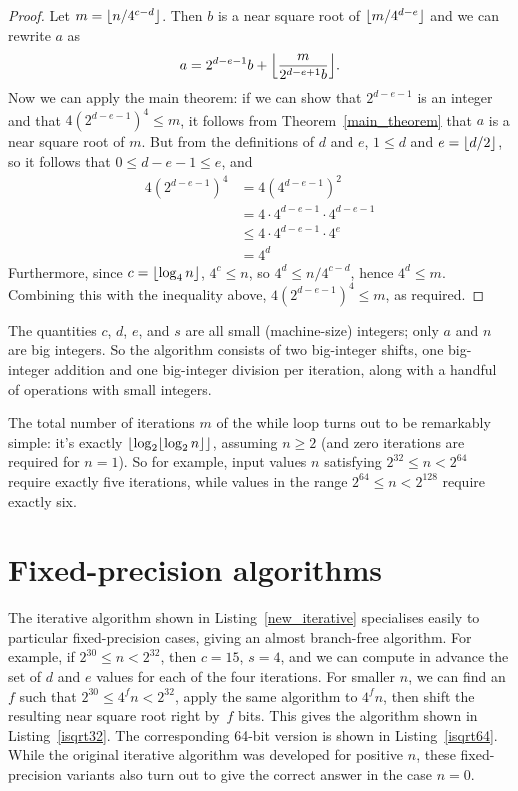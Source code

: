 \documentclass[a4paper]{article}
\DeclarePairedDelimiter\floor{\lfloor}{\rfloor}
\theoremstyle{plain}
\theoremstyle{definition}
\begin{document}
\begin{proof}
  Let $m = \floor{n / 4^{c-d}}$. Then $b$ is a near square root of
  $\floor{m/4^{d-e}}$ and we can rewrite $a$ as
  $$a = 2^{d-e-1}b + \floor*{\frac{m}{2^{d-e+1}b}}.$$ Now we can apply the main
  theorem: if we can show that $2^{d-e-1}$ is an integer and that
  $4(2^{d-e-1})^4 \le m$, it follows from Theorem~\ref{main_theorem} that $a$
  is a near square root of $m$. But from the definitions of $d$ and $e$, $1 \le
  d$ and $e = \floor{d/2}$, so it follows that $0 \le d - e - 1 \le e$, and
  \begin{align*}
    4(2^{d-e-1})^4 &= 4(4^{d-e-1})^2 \\
                  &= 4\cdot 4^{d-e-1}\cdot 4^{d-e-1} \\
                  &\le 4\cdot 4^{d-e-1}\cdot 4^e \\
                  &= 4^d
  \end{align*}
  Furthermore, since $c = \floor{\log_4 n}$, $4^c \le n$, so $4^d \le n /
  4^{c-d}$, hence $4^d \le m$. Combining this with the inequality above,
  $4(2^{d-e-1})^4 \le m$, as required.
\end{proof}

The quantities $c$, $d$, $e$, and $s$ are all small (machine-size)
integers; only $a$ and $n$ are big integers. So the algorithm consists of
two big-integer shifts, one big-integer addition and one big-integer division per
iteration, along with a handful of operations with small integers.

The total number of iterations $m$ of the while loop turns out to be remarkably
simple: it's exactly $\floor*{\log_2 \floor{\log_2 n}}$, assuming $n\ge 2$ (and zero
iterations are required for $n = 1$). So
for example, input values $n$ satisfying $2^{32} \le n < 2^{64}$ require exactly
five iterations, while values in the range $2^{64} \le n < 2^{128}$ require
exactly six.

\section{Fixed-precision algorithms}

The iterative algorithm shown in Listing~\ref{new_iterative} specialises easily
to particular fixed-precision cases, giving an almost branch-free algorithm.
For example, if $2^{30} \le n < 2^{32}$, then $c = 15$, $s=4$, and we can
compute in advance the set of $d$ and $e$ values for each of the four
iterations. For smaller $n$, we can find an $f$ such that $2^{30} \le 4^f n <
2^{32}$, apply the same algorithm to $4^f n$, then shift the resulting near
square root right by~$f$ bits. This gives the algorithm shown in
Listing~\ref{isqrt32}. The corresponding 64-bit version is shown in
Listing~\ref{isqrt64}. While the original iterative algorithm was developed
for positive $n$, these fixed-precision variants also turn out
to give the correct answer in the case $n = 0$.
\end{document}
